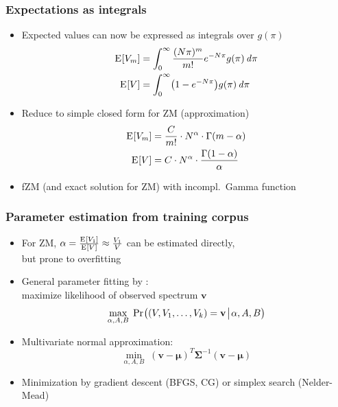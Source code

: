 \documentclass[t]{beamer} %
\begin{document}
\begin{frame}
  \frametitle{Expectations as integrals}

  \begin{itemize}
  \item Expected values can now be expressed as integrals over $g(\pi)$
    \begin{align*}
      \mathrm{E}_{}[V_m] &= \int_0^{\infty} \frac{(N\pi)^m}{m!} e^{-N\pi} g(\pi) \,\mathit{d{\pi}}\\
      \mathrm{E}_{}[V] &= \int_0^{\infty} \bigl( 1 - e^{-N\pi} \bigr) g(\pi) \,\mathit{d{\pi}}
    \end{align*}
  \item<2-> Reduce to simple closed form for ZM (approximation)
    \begin{align*}
      \mathrm{E}_{}[V_m] &= \frac{C}{m!} \cdot N^{\alpha} \cdot \Gamma (m - \alpha) \\
      \mathrm{E}_{}[V] &= C \cdot N^{\alpha} \cdot \frac{\Gamma(1 - \alpha)}{\alpha}
    \end{align*}
  \item<2-> fZM (and exact solution for ZM) with incompl.\ Gamma function
  \end{itemize}
\end{frame}

\begin{frame}
  \frametitle{Parameter estimation from training corpus}

  \begin{itemize}
  \item For ZM, $\alpha = \frac{\mathrm{E}_{}[V_1]}{\mathrm{E}_{}[V]} \approx \frac{V_1}{V}$ can be estimated directly,\\
    but prone to overfitting
  \item General parameter fitting by :\\
    maximize likelihood of observed spectrum $\mathbf{v}$
    \[
      \max_{\alpha, A, B}\; \mathop{\mathrm{Pr}_{}}\bigl((V, V_1, \ldots, V_k) = \mathbf{v}\!\bigm|\!\alpha, A, B\bigr)
    \]
  \item<2-> Multivariate normal approximation:\\
    \[
      \min_{\alpha, A, B}\; (\mathbf{v} - \pmb{\mu})^T \pmb{\Sigma}^{-1} (\mathbf{v} - \pmb{\mu})
    \]
  \item<2-> Minimization by gradient descent (BFGS, CG) or simplex search (Nelder-Mead)
  \end{itemize}
\end{frame}
\end{document}

